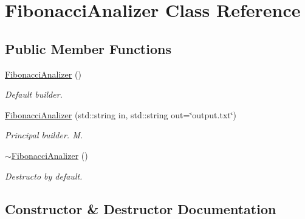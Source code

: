 \hypertarget{classFibonacciAnalizer}{}\section{Fibonacci\+Analizer Class Reference}
\label{classFibonacciAnalizer}
\subsection*{Public Member Functions}
\begin{DoxyCompactItemize}
\item 
\mbox{\label{classFibonacciAnalizer_a5d88fb992ff11b87c346f3980ee17826}} 
\hyperlink{classFibonacciAnalizer_a5d88fb992ff11b87c346f3980ee17826}{Fibonacci\+Analizer} ()
\begin{DoxyCompactList}\small\item\em Default builder. \end{DoxyCompactList}\item 
\hyperlink{classFibonacciAnalizer_a7087072c8db34898ce6d6654a4c732be}{Fibonacci\+Analizer} (std\+::string in, std\+::string out=\char`\"{}output.\+txt\char`\"{})
\begin{DoxyCompactList}\small\item\em Principal builder. M. \end{DoxyCompactList}\item 
\mbox{\label{classFibonacciAnalizer_a0e0588c297d045c864127a49ae6c3869}} 
\hyperlink{classFibonacciAnalizer_a0e0588c297d045c864127a49ae6c3869}{$\sim$\+Fibonacci\+Analizer} ()
\begin{DoxyCompactList}\small\item\em Destructo by default. \end{DoxyCompactList}\end{DoxyCompactItemize}


\subsection{Constructor \& Destructor Documentation}
\mbox{\label{classFibonacciAnalizer_a7087072c8db34898ce6d6654a4c732be}} 

